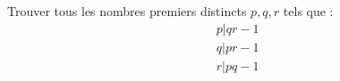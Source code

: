 Trouver tous les nombres premiers distincts $p, q, r$ tels que :
\begin{align*}
& p | qr - 1 \\
& q | pr - 1 \\
& r | pq - 1 \\
\end{align*}